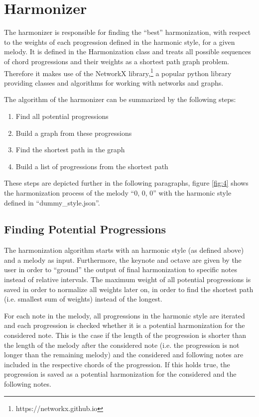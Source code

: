 \section{Harmonizer}
The harmonizer is responsible for finding the ``best'' harmonization, with respect to the weights of each progression defined in the harmonic style, for a given melody. It is defined in the Harmonization class and treats all possible sequences of chord progressions and their weights as a shortest path graph problem. Therefore it makes use of the NetworkX library,\footnote{https://networkx.github.io} a popular python library providing classes and algorithms for working with networks and graphs. 

The algorithm of the harmonizer can be summarized by the following steps:
\begin{enumerate}
  \item Find all potential progressions
  \item Build a graph from these progressions
  \item Find the shortest path in the graph
  \item Build a list of progressions from the shortest path
\end{enumerate}
These steps are depicted further in the following paragraphs, figure \ref{fig:4} shows the harmonization process of the melody ``0, 0, 0'' with the harmonic style defined in ``dummy\_style.json''.

\subsection{Finding Potential Progressions}
The harmonization algorithm starts with an harmonic style (as defined above) and a melody as input. Furthermore, the keynote and octave are given by the user in order to ``ground'' the output of final harmonization to specific notes instead of relative intervals. The maximum weight of all potential progressions is saved in order to normalize all weights later on, in order to find the shortest path (i.e. smallest sum of weights) instead of the longest.

For each note in the melody, all progressions in the harmonic style are iterated and each progression is checked whether it is a potential harmonization for the considered note. This is the case if the length of the progression is shorter than the length of the melody after the considered note (i.e. the progression is not longer than the remaining melody) and the considered and following notes are included in the respective chords of the progression. If this holds true, the progression is saved as a potential harmonization for the considered and the following notes.

